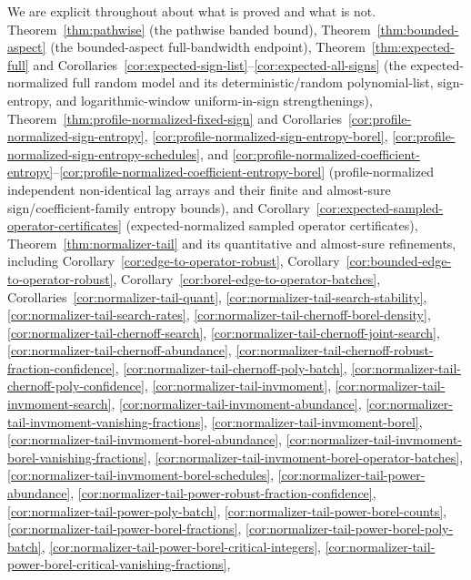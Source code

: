 \documentclass[11pt]{amsart}
\numberwithin{equation}{section}
\theoremstyle{definition}
\theoremstyle{remark}
\begin{document}
We are explicit throughout about what is proved and what is not.
Theorem~\ref{thm:pathwise} (the pathwise banded bound),
Theorem~\ref{thm:bounded-aspect} (the bounded-aspect full-bandwidth endpoint),
Theorem~\ref{thm:expected-full} and
Corollaries~\ref{cor:expected-sign-list}--\ref{cor:expected-all-signs}
(the expected-normalized full random model and its deterministic/random
polynomial-list, sign-entropy, and logarithmic-window uniform-in-sign
strengthenings),
Theorem~\ref{thm:profile-normalized-fixed-sign} and
Corollaries~\ref{cor:profile-normalized-sign-entropy},
\ref{cor:profile-normalized-sign-entropy-borel},
\ref{cor:profile-normalized-sign-entropy-schedules}, and
\ref{cor:profile-normalized-coefficient-entropy}--\ref{cor:profile-normalized-coefficient-entropy-borel}
(profile-normalized independent non-identical lag arrays and their finite and
almost-sure sign/coefficient-family entropy bounds), and
Corollary~\ref{cor:expected-sampled-operator-certificates}
(expected-normalized sampled operator certificates),
Theorem~\ref{thm:normalizer-tail} and its quantitative and almost-sure
refinements, including
Corollary~\ref{cor:edge-to-operator-robust},
Corollary~\ref{cor:bounded-edge-to-operator-robust},
Corollary~\ref{cor:borel-edge-to-operator-batches},
Corollaries~\ref{cor:normalizer-tail-quant},
\ref{cor:normalizer-tail-search-stability},
\ref{cor:normalizer-tail-search-rates},
\ref{cor:normalizer-tail-chernoff-borel-density},
\ref{cor:normalizer-tail-chernoff-search},
\ref{cor:normalizer-tail-chernoff-joint-search},
\ref{cor:normalizer-tail-chernoff-abundance},
\ref{cor:normalizer-tail-chernoff-robust-fraction-confidence},
\ref{cor:normalizer-tail-chernoff-poly-batch},
\ref{cor:normalizer-tail-chernoff-poly-confidence},
\ref{cor:normalizer-tail-invmoment},
\ref{cor:normalizer-tail-invmoment-search},
\ref{cor:normalizer-tail-invmoment-abundance},
\ref{cor:normalizer-tail-invmoment-vanishing-fractions},
\ref{cor:normalizer-tail-invmoment-borel},
\ref{cor:normalizer-tail-invmoment-borel-abundance},
\ref{cor:normalizer-tail-invmoment-borel-vanishing-fractions},
\ref{cor:normalizer-tail-invmoment-borel-operator-batches},
\ref{cor:normalizer-tail-invmoment-borel-schedules},
\ref{cor:normalizer-tail-power-abundance},
\ref{cor:normalizer-tail-power-robust-fraction-confidence},
\ref{cor:normalizer-tail-power-poly-batch},
\ref{cor:normalizer-tail-power-borel-counts},
\ref{cor:normalizer-tail-power-borel-fractions},
\ref{cor:normalizer-tail-power-borel-poly-batch},
\ref{cor:normalizer-tail-power-borel-critical-integers},
\ref{cor:normalizer-tail-power-borel-critical-vanishing-fractions},
\end{document}
